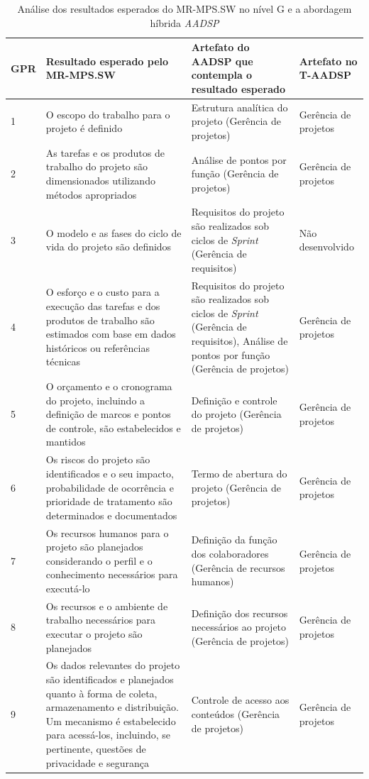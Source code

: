 \documentclass{acm_proc_article-sp}
\begin{document}
\begin{appendices}
\begin{table}[h]
\scriptsize
\caption{Análise dos resultados esperados do MR-MPS.SW no nível G e a abordagem híbrida \textit{AADSP} \cite{aadsp:hibirdo}} 
\centering
\begin{tabular}{|p{10mm}|p{60mm}|p{60mm}|p{25mm}|}
\hline
\textbf{GPR} & \textbf{Resultado esperado pelo MR-MPS.SW} & \textbf{Artefato do AADSP que contempla o resultado esperado} & \textbf{Artefato no T-AADSP} \\
\hline
1 & O escopo do trabalho para o projeto é definido & Estrutura analítica do projeto
(Gerência de projetos) & Gerência de projetos \\
2 & As tarefas e os produtos de trabalho do projeto são dimensionados utilizando métodos apropriados & Análise de pontos por função (Gerência de projetos) & Gerência de projetos\\
3 & O modelo e as fases do ciclo de vida do projeto são definidos & Requisitos do projeto são realizados sob ciclos de \textit{Sprint} (Gerência de requisitos) & Não desenvolvido\\
4 &  O esforço e o custo para a execução das tarefas e dos produtos de trabalho são estimados com base em dados históricos ou referências técnicas & Requisitos do projeto são realizados sob ciclos de \textit{Sprint} (Gerência de requisitos), Análise de pontos por função (Gerência de projetos) & Gerência de projetos\\
5 & O orçamento e o cronograma do projeto, incluindo a definição de marcos e pontos de controle, são estabelecidos e mantidos
& Definição e controle do projeto (Gerência de projetos) & Gerência de projetos\\
6 & Os riscos do projeto são identificados e o seu impacto, probabilidade de ocorrência e prioridade de tratamento são
determinados e documentados & Termo de abertura do projeto (Gerência de projetos) & Gerência de projetos\\
7 & Os recursos humanos para o projeto são planejados considerando o perfil e o conhecimento necessários para executá-lo & Definição da função dos colaboradores (Gerência de recursos humanos) & Gerência de projetos\\
8 & Os recursos e o ambiente de trabalho necessários para executar o projeto são planejados & Definição dos recursos necessários ao projeto (Gerência de projetos) & Gerência de projetos\\
9 & Os dados relevantes do projeto são identificados e planejados quanto à forma de coleta, armazenamento e distribuição. Um mecanismo é estabelecido para acessá-los, incluindo, se pertinente, questões de privacidade e segurança & Controle de acesso aos conteúdos (Gerência de projetos) & Gerência de projetos\\

\end{tabular}
\end{table}
\end{appendices}
\end{document}

